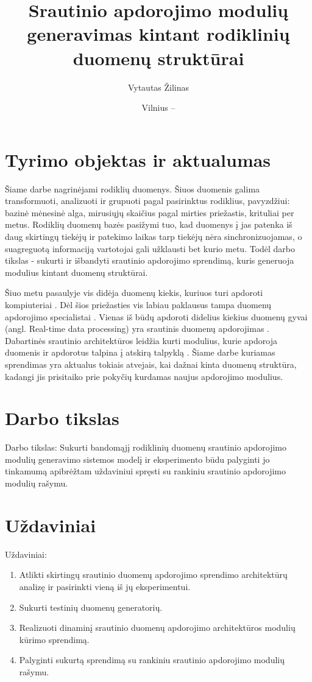 \documentclass{VUMIFPSbakalaurinis}
\title{Srautinio apdorojimo modulių generavimas kintant rodiklinių duomenų struktūrai}
\author{Vytautas Žilinas}
\date{Vilnius – \the\year}
\begin{document}
 
\maketitle

\cleardoublepage{}
\setcounter{page}{2}

\section{Tyrimo objektas ir aktualumas}
Šiame darbe nagrinėjami rodiklių duomenys. Šiuos duomenis galima transformuoti, analizuoti ir grupuoti pagal pasirinktus rodiklius, 
pavyzdžiui: bazinė mėnesinė alga, mirusiųjų skaičius pagal mirties priežastis, krituliai per metus. 
Rodiklių duomenų bazės pasižymi tuo, kad duomenys į jas patenka iš daug skirtingų tiekėjų ir patekimo laikas tarp tiekėjų nėra 
sinchronizuojamas, o suagreguotą informaciją vartotojai gali užklausti bet kurio metu. Todėl darbo tikslas - sukurti ir išbandyti 
srautinio apdorojimo sprendimą, kuris generuoja modulius kintant duomenų struktūrai. \par
Šiuo metu pasaulyje vis didėja duomenų kiekis, kuriuos turi apdoroti kompiuteriai \cite{DataTrend}. 
Dėl šios priežasties vis labiau paklausus tampa duomenų apdorojimo specialistai \cite{IBMprediction}. 
Vienas iš būdų apdoroti didelius kiekius duomenų gyvai (angl. Real-time data processing) yra srautinis duomenų apdorojimas \cite{BigData, StreamProcessingInData}. 
Dabartinės srautinio architektūros leidžia kurti modulius, kurie apdoroja duomenis ir apdorotus talpina į atskirą talpyklą \cite{8Requirements}. 
Šiame darbe kuriamas sprendimas yra aktualus tokiais atvejais, kai dažnai kinta duomenų struktūra, kadangi jis prisitaiko prie pokyčių kurdamas naujus apdorojimo modulius.

\section{Darbo tikslas}
Darbo tikslas: Sukurti bandomąjį rodiklinių duomenų srautinio apdorojimo modulių 
generavimo sistemos modelį ir eksperimento būdu palyginti jo tinkamumą apibrėžtam 
uždaviniui spręsti su rankiniu srautinio apdorojimo modulių rašymu.

\section{Uždaviniai}
Uždaviniai:
\begin{enumerate}
  \item Atlikti skirtingų srautinio duomenų apdorojimo sprendimo architektūrų analizę ir pasirinkti vieną iš jų eksperimentui.
  \item Sukurti testinių duomenų generatorių.
  \item Realizuoti dinaminį srautinio duomenų apdorojimo architektūros modulių kūrimo sprendimą.
	\item Palyginti sukurtą sprendimą su rankiniu srautinio apdorojimo modulių rašymu.
\end{enumerate}
\end{document}
